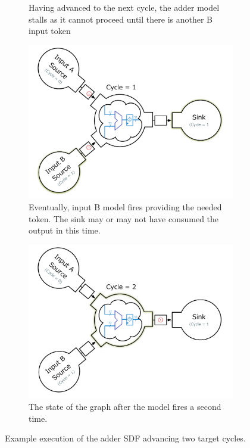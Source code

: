 \begin{figure}
\begin{subfigure}[t]{0.45\textwidth}
        \caption{Having advanced to the next cycle, the adder model stalls as
        it cannot proceed until there is another B input token}
    \end{subfigure}
    \begin{subfigure}[t]{0.45\textwidth}
	    \centering
        \includegraphics[width=\linewidth]{figures/adder-ex3.pdf}
        \caption{Eventually, input B model fires providing the needed token. The sink may or
        may not have consumed the output in this time.}
    \end{subfigure}\hspace{0.1\linewidth}
    \begin{subfigure}[t]{0.45\textwidth}
	    \centering
        \includegraphics[width=\linewidth]{figures/adder-ex4.pdf}
        \caption{The state of the graph after the model fires a second time.}
    \end{subfigure}
    \caption{Example execution of the adder SDF advancing two target cycles.}
    \label{fig:adder-execution}
\end{figure}

